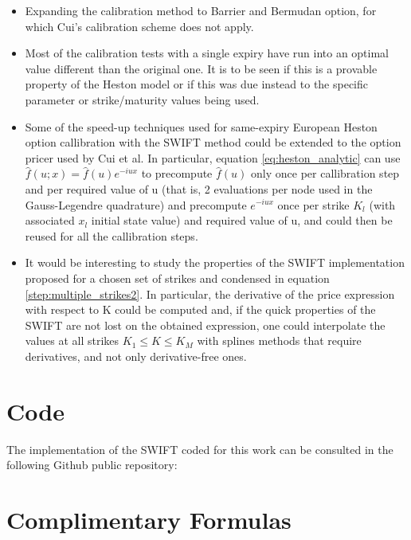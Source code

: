 \documentclass[12,twoside]{mammeTFM}
\theoremstyle{definition}
\theoremstyle{remark}
\begin{document}
\begin{itemize}

\item Expanding the calibration method to Barrier and Bermudan option, for which Cui's calibration scheme does not apply.

\item Most of the calibration tests with a single expiry have run into an optimal value different than the original one. It is to be seen if this is a provable property of the Heston model or if this was due instead to the specific parameter or strike/maturity values being used.

\item Some of the speed-up techniques used for same-expiry European Heston option callibration with the SWIFT method could be extended to the option pricer used by Cui et al. In particular, equation \ref{eq:heston_analytic} can use $\hat{f}(u; x) = \hat{f}(u) e^{-i u x}$ to precompute $\hat{f}(u)$ only once per callibration step and per required value of u (that is, 2 evaluations per node used in the Gauss-Legendre quadrature) and precompute $e^{-i u x}$ once per strike $K_l$ (with associated $x_l$ initial state value) and required value of u, and could then be reused for all the callibration steps.

\item It would be interesting to study the properties of the SWIFT implementation proposed for a chosen set of strikes and condensed in equation \ref{step:multiple_strikes2}. In particular, the derivative of the price expression with respect to K could be computed and, if the quick properties of the SWIFT are not lost on the obtained expression, one could interpolate the values at all strikes $K_1 \leq K \leq K_M$ with splines methods that require derivatives, and not only derivative-free ones.

\end{itemize}

\newpage

{}


\appendix
\vfill\newpage 
\section{Code}
The implementation of the SWIFT coded for this work can be consulted in the following Github public repository:


\section{Complimentary Formulas}
\end{document}
